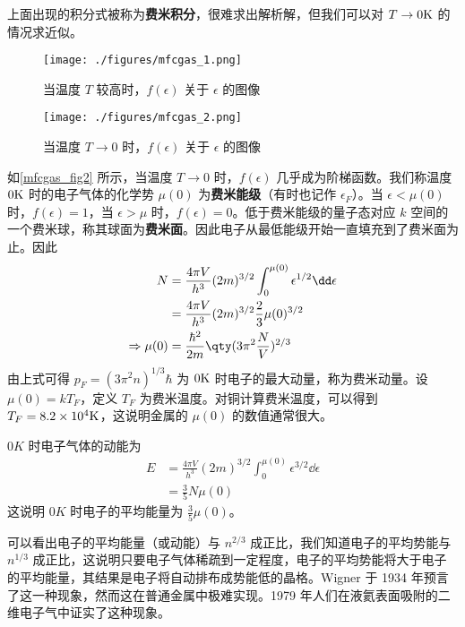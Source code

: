 上面出现的积分式被称为\textbf{费米积分}，很难求出解析解，但我们可以对 $T\rightarrow 0 \rm{K}$ 的情况求近似。
\begin{figure}[ht]
\centering
\texttt{[image: ./figures/mfcgas\_1.png]}
\caption{当温度 $T$ 较高时，$f(\epsilon )$ 关于 $\epsilon$ 的图像} \label{mfcgas_fig1}
\end{figure}
\begin{figure}[ht]
\centering
\texttt{[image: ./figures/mfcgas\_2.png]}
\caption{当温度 $T\rightarrow 0$ 时，$f(\epsilon )$ 关于 $\epsilon$ 的图像} \label{mfcgas_fig2}
\end{figure}

如\autoref{mfcgas_fig2} 所示，当温度 $T\rightarrow 0$ 时，$f(\epsilon)$ 几乎成为阶梯函数。我们称温度 $0\rm{K}$ 时的电子气体的化学势 $\mu(0)$ 为\textbf{费米能级}（有时也记作 $\epsilon_F$）。当 $\epsilon<\mu(0)$ 时，$f(\epsilon)=1$，当 $\epsilon>\mu$ 时，$f(\epsilon)=0$。低于费米能级的量子态对应 $k$ 空间的一个费米球，称其球面为\textbf{费米面}。因此电子从最低能级开始一直填充到了费米面为止。因此
\begin{equation}
\begin{aligned}
N&=\frac{4\pi V}{h^3}(2m)^{3/2}\int_0^{\mu(0)}\epsilon^{1/2}\dd \epsilon
\\
&=\frac{4\pi V}{h^3}(2m)^{3/2}\frac{2}{3}\mu(0)^{3/2}\\
\Rightarrow \mu(0)&=\frac{\hbar^2}{2m}\qty(3\pi^2\frac{N}{V})^{2/3}
\end{aligned}
\end{equation}
由上式可得 $p_F=(3\pi^2n)^{1/3}\hbar$ 为 $0\rm{K}$ 时电子的最大动量，称为费米动量。设 $\mu(0)=kT_F$，定义 $T_F$ 为费米温度。对铜计算费米温度，可以得到 $T_F=8.2\times 10^4 \rm{K}$，这说明金属的 $\mu(0)$ 的数值通常很大。

$0K$ 时电子气体的动能为
\begin{equation}
\begin{aligned}
E&=\frac{4\pi V}{h^3}(2m)^{3/2}\int_0^{\mu(0)} \epsilon^{3/2}\dd \epsilon\\
&=\frac{3}{5}N\mu(0)
\end{aligned}
\end{equation}
这说明 $0K$ 时电子的平均能量为 $\frac{3}{5}\mu(0)$。

可以看出电子的平均能量（或动能）与 $n^{2/3}$ 成正比，我们知道电子的平均势能与 $n^{1/3}$ 成正比，这说明只要电子气体稀疏到一定程度，电子的平均势能将大于电子的平均能量，其结果是电子将自动排布成势能低的晶格。Wigner 于 1934 年预言了这一种现象，然而这在普通金属中极难实现。1979 年人们在液氦表面吸附的二维电子气中证实了这种现象。


